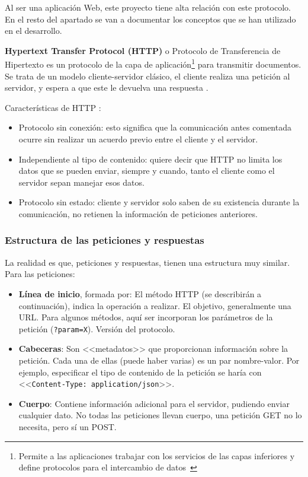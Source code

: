 Al ser una aplicación Web, este proyecto tiene alta relación con este protocolo.
En el resto del apartado se van a documentar los conceptos que se han utilizado
en el desarrollo.

\textbf{Hypertext Transfer Protocol (HTTP)} o Protocolo de Transferencia de
Hipertexto es un protocolo de la capa de aplicación\footnote{Permite a las
aplicaciones trabajar con los servicios de las capas inferiores y define
protocolos para el intercambio de datos~\cite{eswiki:149372346}} para transmitir
documentos. Se trata de un modelo cliente-servidor clásico, el cliente realiza
una petición al servidor, y espera a que este le devuelva una respuesta
\cite{http:mdn}.



Características de HTTP \cite{http:features}:
\begin{itemize}
	\item Protocolo sin conexión: esto significa que la comunicación antes
	comentada ocurre sin realizar un acuerdo previo entre el cliente y el
	servidor.
	\item Independiente al tipo de contenido: quiere decir que HTTP no limita
	los datos que se pueden enviar, siempre y cuando, tanto el cliente como el
	servidor sepan manejar esos datos.
	\item Protocolo sin estado: cliente y servidor solo saben de su existencia
	durante la comunicación, no retienen la información de peticiones
	anteriores.
\end{itemize}


\subsubsection{Estructura de las peticiones y respuestas}

La realidad es que, peticiones y respuestas, tienen una estructura muy similar. Para las peticiones:
\begin{itemize}
	\item \textbf{Línea de inicio}, formada por:
  \subitem El método HTTP (se describirán a continuación), indica la operación a realizar.
  \subitem El objetivo, generalmente una URL. Para algunos métodos, aquí ser
  incorporan los parámetros de la petición (\texttt{?param=X}).
  \subitem Versión del protocolo.
	\item \textbf{Cabeceras}: Son <<metadatos>> que proporcionan información sobre la
  petición. Cada una de ellas (puede haber varias) es un par nombre-valor.	Por
  ejemplo, especificar el tipo de contenido de la petición se haría con
  <<\texttt{Content-Type: application/json}>>.
  \item \textbf{Cuerpo}: Contiene información adicional para el servidor, pudiendo enviar
  cualquier dato. No todas las peticiones llevan cuerpo, una petición GET no lo
  necesita, pero sí un POST.
\end{itemize}

